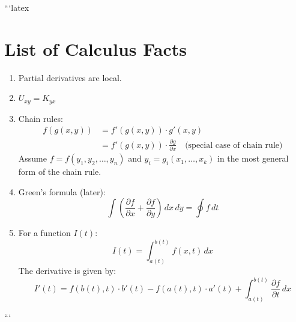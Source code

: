 ```latex
\section*{List of Calculus Facts}

\begin{enumerate}
    \item Partial derivatives are local.
    
    \item $U_{xy} = K_{yx}$
    
    \item Chain rules:
    \begin{align*}
        f(g(x, y)) &= f'(g(x, y)) \cdot g'(x, y) \\
        &= f'(g(x, y)) \cdot \frac{\partial g}{\partial x} \quad \text{(special case of chain rule)}
    \end{align*}
    Assume $f = f(y_1, y_2, \ldots, y_n)$ and $y_i = g_i(x_1, \ldots, x_k)$ in the most general form of the chain rule.
    
    \item Green's formula (later):
    \[
    \int \left( \frac{\partial f}{\partial x} + \frac{\partial f}{\partial y} \right) \, dx \, dy = \oint f \, dt
    \]
    
    \item For a function $I(t)$:
    \[
    I(t) = \int_{a(t)}^{b(t)} f(x, t) \, dx
    \]
    The derivative is given by:
    \[
    I'(t) = f(b(t), t) \cdot b'(t) - f(a(t), t) \cdot a'(t) + \int_{a(t)}^{b(t)} \frac{\partial f}{\partial t} \, dx
    \]
\end{enumerate}
```
